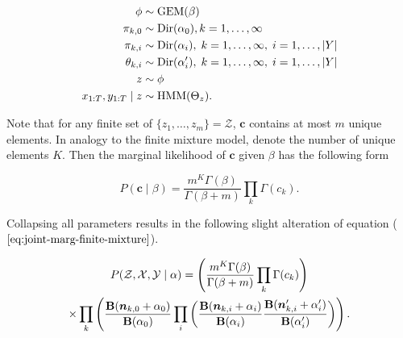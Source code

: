 \documentclass[12pt]{report}
\newcommand{\p}[0]{\prime}
\newcommand{\1}[0]{\mathbbm{1}}
\newcommand{\Dir}[0]{\textnormal{Dir}}
\newcommand{\GEM}[0]{\textnormal{GEM}}
\newcommand{\HMM}[0]{\textnormal{HMM}}
\newcommand{\Bf}[0]{\text{\textbf{B}}}
\newcommand{\seq}[3]{\ensuremath{#1_{{#2}:{#3}}}}
\DeclarePairedDelimiter\abs{\lvert}{\rvert}%
\begin{document}
\begin{align*}
    \phi & \sim \GEM(\beta) \\
    \pi_{k,0} & \sim \Dir(\alpha_0), k=1,\ldots,\infty \\
    \pi_{k,i} & \sim \Dir(\alpha_i),\; k=1,\ldots,\infty,\; i=1,\ldots,\abs{Y} \\
    \theta_{k,i} & \sim \Dir(\alpha_i^\p),\; k=1,\ldots,\infty,\; i = 1,\ldots,\abs{Y} \\
    z & \sim \phi \\
    \seq{x}{1}{T}, \seq{y}{1}{T} \mid z & \sim \HMM(\Theta_z).
\end{align*}

Note that for any finite set of $\{z_1, \ldots, z_m\} = \mathcal{Z}$,
$\bm{c}$ contains at most $m$ unique elements. In analogy to the finite
mixture model, denote the number of unique elements $K$. Then the marginal likelihood
of $\bm{c}$ given $\beta$ has the following form~\cite{kyung-estimation-dirichlet}

\begin{equation}\label{dp-marg}
    P(\bm{c} \mid \beta) = \frac{m^K \Gamma(\beta)}{\Gamma(\beta + m)} \prod_k \Gamma(c_k).
\end{equation}

Collapsing all parameters results in the following slight alteration of
equation ($\ref{eq:joint-marg-finite-mixture}$).

\begin{multline}
    P(\mathcal{Z}, \mathcal{X}, \mathcal{Y} \mid \alpha) =
    \left(\frac{m^K \Gamma(\beta)}{\Gamma(\beta + m)} \prod_k \Gamma(c_k)\right) \\
    \times \prod_k
    \left(
        \frac{\Bf(\bm{n}_{k,0} + \alpha_0)}{\Bf(\alpha_0)}
        \prod_i
        \left(
            \frac{\Bf(\bm{n}_{k,i} + \alpha_i)}{\Bf(\alpha_i)}
            \frac{\Bf(\bm{n}_{k,i}^\p + \alpha_i^\p)}{\Bf(\alpha_i^\p)}
        \right)
    \right). \label{eq:joint-marg-infinite-mixture}
\end{multline}
\end{document}
